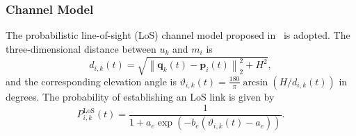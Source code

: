 \documentclass[journal]{IEEEtran}
\begin{document}



\subsubsection{Channel Model}


The probabilistic line-of-sight (LoS) channel model proposed
in~\cite{alhourani2014optimal,azari2018uav_los} is adopted. The
three-dimensional distance between $u_k$ and $m_i$ is
\begin{equation}\label{eq:dist_uav_gu}
d_{i,k}(t)=\sqrt{\left\|\bm{q}_k(t)-\bm{p}_i(t)\right\|_2^{2}+H^{2}},
\end{equation}
and the corresponding elevation angle is
$\vartheta_{i,k}(t)=\frac{180}{\pi}\arcsin\!\left(H/d_{i,k}(t)\right)$ in
degrees. The probability of establishing an LoS link is given by
\begin{equation}\label{eq:losprob}
P_{i,k}^{\mathrm{LoS}}(t) = \frac{1}{1 + a_e \exp(-b_e(\vartheta_{i,k}(t) - a_e))}.
\end{equation}
\end{document}
